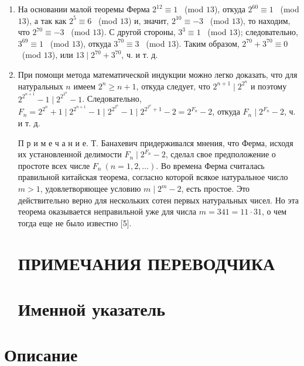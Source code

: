 \documentclass[12pt, a4paper, openany]{book}
\begin{document}
\begin{enumerate}
	\item На основании малой теоремы Ферма $2^{12}\equiv1$ \ (mod $13$), откуда $2^{60}\equiv1$ \ (mod $13$), а так как $2^{5}\equiv6$ \ (mod $13$) и, значит, $2^{10}\equiv-3$ \ (mod $13$), то находим, что $2^{70}\equiv-3$ \ (mod $13$). С другой стороны, $3^{3}\equiv1$ \ (mod $13$); следовательно, $3^{69}\equiv1$ \ (mod $13$), откуда $3^{70}\equiv3$ \ (mod $13$). Таким образом, $2^{70} + 3^{70}\equiv0$ \ (mod $13$), или $13 \mid 2^{70} + 3^{70}$, ч. и т. д.
	\item При помощи метода математической индукции можно легко доказать, что для натуральных $n$ имеем $2^n \geqslant n+1$, откуда следует, что $2^{n+1} \mid 2^{2^n}$ и поэтому $2^{2^{n+1}}-1 \mid 2^{2^{2^n}}-1$. Следовательно, $F_n = 2^{2^n} + 1 \mid 2^{2^{n+1}}-1 \mid 2^{2^{2^n}}-1 \mid 2^{2^{2^n}+1}-2 = 2^{F_n}-2$, откуда $F_n \mid 2^{F_n}-2$, ч. и т. д.
	
{\footnotesize 	П р и м е ч а н и е. Т. Банахевич придерживался мнения, что Ферма, исходя их установленной делимости $F_n \mid 2^{F_n}-2$, сделал свое предположение о простоте всех числе $F_n \ (n=1,2,\dots)$. Во времена Ферма считалась правильной китайская теорема, согласно которой всякое натуральное число $m>1$, удовлетворяющее условию $m \mid 2^m-2$, есть простое. Это действительно верно для нескольких сотен первых натуральных чисел. Но эта теорема оказывается неправильной уже для числа $m=341=11 \cdot 31$, о чем тогда еще не было известно [5].}

\newpage

\section[Примечания переводчика]{\center ПРИМЕЧАНИЯ ПЕРЕВОДЧИКА}	
\newpage

\section[Именной указатель]{\center Именной указатель}	
\printindex
	
\end{enumerate}


	\newpage
	\tableofcontents
	
	\thispagestyle{empty} %
	
	\newpage
	
	\setcounter{secnumdepth}{0}  
	
	
		\section*{Описание}
	
\end{document}
